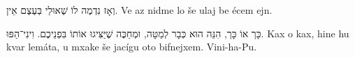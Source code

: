 \begin{sentence}
	{וְאָז נִדְמֶה לוֹ שֶׁאוּלַי בְּעֶצֶם אֵין.}
	{Ve az nidme lo še ulaj be écem ejn.}
	{}
\end{sentence}

\begin{sentence}
	{כָּך אוֹ כָּך, הִנֵּה הוּא כְּבָר לְמַטָּה, וּמְחַכֶּה שֶׁיַּצִּיגוּ אוֹתוֹ בִּפְנֵיכֶם. וִינִי־הַפּוּ.}
	{Kax o kax, hine hu kvar lemáta, u mxake še jacígu oto bifnejxem. Vini-ha-Pu.}
	{}
\end{sentence}


